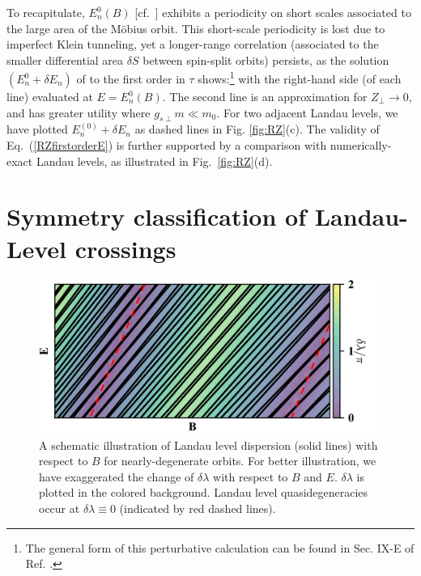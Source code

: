 \documentclass[aps, showpacs, twocolumn, notitlepage, superscriptaddress]{revtex4-1}
\begin{document}
To recapitulate, $E_n^0(B)$ [cf.\ ] exhibits a periodicity on short scales associated to the large area of the M\"obius orbit. This short-scale periodicity is lost due to  imperfect Klein tunneling, yet a longer-range correlation (associated to the smaller differential area $\delta S$ between spin-split orbits) persists, as the solution $(E_n^0+\delta E_n)$ of  to the first order in $\tau$ shows:\footnote{The general form of this perturbative calculation can be found in Sec. IX-E of Ref. .} 
with the right-hand side (of each line) evaluated at $E{=}E_n^0(B)$. The second line is an approximation for $Z_{\perp}{\rightarrow}0$, and has greater utility where $g_{s\perp}m{\ll}m_0$. For two adjacent Landau levels, we have plotted $E_n^{(0)}+\delta E_n$ as dashed lines in Fig. \ref{fig:RZ}(c). The validity of Eq.\ (\ref{RZfirstorderE}) is further supported by a comparison with numerically-exact Landau levels, as illustrated in Fig.\ \ref{fig:RZ}(d).


\section{Symmetry classification of Landau-Level crossings}\label{sec:llquasideg}

\begin{figure}
\includegraphics[width=1.0\columnwidth]{LL.png}
\caption{A schematic illustration of Landau level dispersion (solid lines) with respect to $B$ for nearly-degenerate orbits. For better illustration, we have exaggerated the change of $\delta\lambda$ with respect to $B$ and $E$. $\delta\lambda$ is plotted in the colored background. Landau level quasidegeneracies occur at $\delta\lambda\equiv 0$ ({indicated by red dashed lines}).\label{fig:LL}}
\end{figure}
\end{document}
